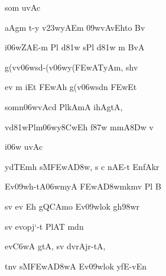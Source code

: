 {\dn som uvAc{\dandabdn}\dontdisplaylinenum }

{\dn aAgm\2 t-y v\323wyAEm \309wvAvEhto Bv{\dandadn} \dontdisplaylinenum}

{\dn i\306w\?ZAE-m Pl\2 d\381w\2 sPl\2 d\381w m\? BvA \vegdn\dontdisplaylinenum}

{\dn g(v\4v\?\306wsd-(v\306wy(\3FEwAT\0yAm, sh\4v  \dontdisplaylinenum}

{\dn ev\2 m\0 iEt \3FEwAh g(v\?\306wsdn\2 \3FEwEt \vegdn\dontdisplaylinenum}

{\dn som\?n\?\306wvAc\?d\2 PlkAmA ihAgtA,{\dandabdn} \dontdisplaylinenum}

{\dn {}v\0d\381wPlm\306wy\38Cw\?Eh f\387w mmA\38Dw v\4 \vegdn\dontdisplaylinenum}

{\dn i\306w uvAc{\dandabdn}\dontdisplaylinenum }

{\dn ydT\0Emh sM\3FEwA\3D8w, s c nAE-t EnfAkr{\dandadn} \dontdisplaylinenum}

{\dn Ev\309wh-tA\306wmyA \3FEwA\3D8wm\?km\?v Pl\2 B \vegdn\dontdisplaylinenum}

{\dn sv\0 ev Eh gQCAmo Ev\309wlok\2 g\5h\?\398wr{\dandabdn} \dontdisplaylinenum}

{\dn sv\0 evopj`-t\? PlAT{\rdt} mdn \vegdn\dontdisplaylinenum}

{\dn ev\3C6wA gtA, sv\?{\qvb} d\?vrAjr-tA,{\dandabdn} \dontdisplaylinenum}

{\dn {}t\?{\qvb}n\4v sM\3FEwA\3D8wA Ev\309wlok\2 yfE-vEn \vegdn\dontdisplaylinenum}

